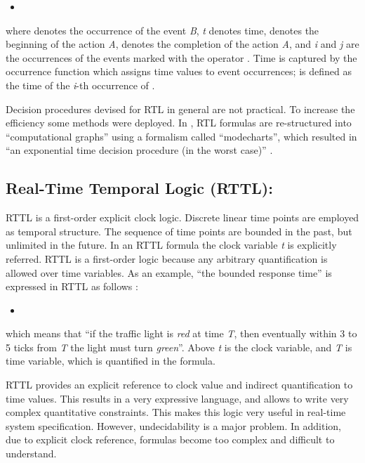 \documentclass[11pt]{article}
\begin{document}
\begin{itemize}
\item 
\end{itemize}

\noindent where  denotes the occurrence of the event \emph{B}, \emph{t} denotes time, \emph{} denotes the beginning of the action \emph{A}, \emph{} denotes the completion of the action \emph{A}, and \emph{i} and \emph{j} are the occurrences of the events marked with the operator . Time is captured by the occurrence function  which assigns time values to event occurrences;  is defined as the time of the \emph{i}-th occurrence of  \cite{Ost92}.

Decision procedures devised for RTL in general are not practical. To increase the efficiency some methods were deployed. In \cite{JS88}, RTL formulas are re-structured into ``computational graphs'' using a formalism called ``modecharts'',  which resulted in ``an exponential time decision procedure (in the worst case)'' \cite{Ost92}. 

\subsection{Real-Time Temporal Logic (RTTL):}

RTTL \cite{OW87,Ost89} is a first-order explicit clock logic. Discrete linear time points are employed as temporal structure. The sequence of time points are bounded in the past, but unlimited in the future. In an RTTL formula the clock variable  \emph{t} is explicitly referred. RTTL is a first-order logic because any arbitrary quantification is allowed over time variables. 
As an example, ``the bounded response time'' is expressed in RTTL as follows \cite{Ost92}:

\begin{itemize}
\item 
\end{itemize}

\noindent which means that ``if the traffic light is \emph{red} at time \emph{T}, then eventually within 3 to 5 ticks from \emph{T} the light must turn \emph{green}''. Above \emph{t} is the clock variable, and  \emph{T} is time variable, which is quantified in the formula. 

RTTL provides an explicit reference to clock value and indirect quantification to time values. This results in a very expressive language, and allows to write very complex quantitative constraints. This makes this logic very useful in real-time system specification. However, undecidability is a major problem. In addition, due to explicit clock reference, formulas become too complex and difficult to  understand. 
\end{document}
